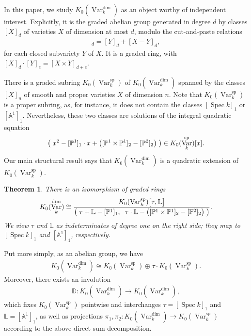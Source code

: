 \documentclass{amsart}
\newtheorem{thm}{Theorem}[section]
\theoremstyle{definition}
\DeclareMathOperator{\Var}{Var}
\DeclareMathOperator{\spr}{sp}
\newcommand{\Kdim}{K_0(\Var_k^{\dim})}
\newcommand{\Kspr}{K_0(\Var_k^{\spr})}
\numberwithin{equation}{section}
\begin{document}
In this paper, we study $\Kdim$ as an object worthy of independent interest. Explicitly, it is the graded abelian group generated in degree $d$ by classes $[X]_d$ of varieties $X$ of dimension at most $d$, modulo the cut-and-paste relations
\begin{align*}
    [X]_d = [Y]_d + [X-Y]_d,
\end{align*}
for each closed subvariety $Y$ of $X$. It is a graded ring, with $[X]_d \cdot [Y]_e = [X \times Y]_{d+e}$.

There is a graded subring $\Kspr$ of $\Kdim$ spanned by the classes $[X]_n$ of smooth and proper varieties $X$ of dimension $n$. Note that $\Kspr$ is a proper subring, as, for instance, it does not contain the classes $[\mathop{\mathrm{Spec}}k]_1$ or $[\mathbb{A}^1]_1$. Nevertheless, these two classes are solutions of the integral quadratic equation
\begin{align*}
    \big( \hspace{.1cm} x^2 - [\mathbb{P}^1]_1 \cdot x + \big( [ \mathbb{P}^1 \times \mathbb{P}^1 ]_2 - [\mathbb{P}^2]_2 \big) \hspace{.1cm} \big) \in \Kspr[x].
\end{align*}
Our main structural result says that $\Kdim$ is a quadratic extension of $\Kspr$.

\begin{thm}\label{intro str iso}
There is an isomorphism of graded rings
\begin{align*}
    \Kdim \cong \frac{\Kspr \big[ \tau, \mathbb{L} \big] }{ \big( \hspace{.1cm} \tau + \mathbb{L} -  [\mathbb{P}^1]_1, \hspace{.2cm} \tau \cdot \mathbb{L} -  \big( [ \mathbb{P}^1 \times \mathbb{P}^1 ]_2 - [\mathbb{P}^2]_2 \big) \hspace{.1cm} \big)}.
\end{align*}
We view $\tau$ and $\mathbb{L}$ as indeterminates of degree one on the right side; they map to $[\mathop{\mathrm{Spec}}k]_1$ and $[\mathbb{A}^1]_1$, respectively.
\end{thm}
Put more simply, as an abelian group, we have
\begin{align*}
    \Kdim \cong \Kspr \oplus \tau \cdot \Kspr.
\end{align*}
Moreover, there exists an involution
\begin{align*}
    \mathbb{D}: \Kdim \rightarrow \Kdim,
\end{align*}
which fixes $\Kspr$ pointwise and interchanges $\tau = [\mathop{\mathrm{Spec}}k]_1$ and $\mathbb{L} = [\mathbb{A}^1]_1$, as well as projections $\pi_1, \pi_2: \Kdim \rightarrow \Kspr$ according to the above direct sum decomposition.
\end{document}
